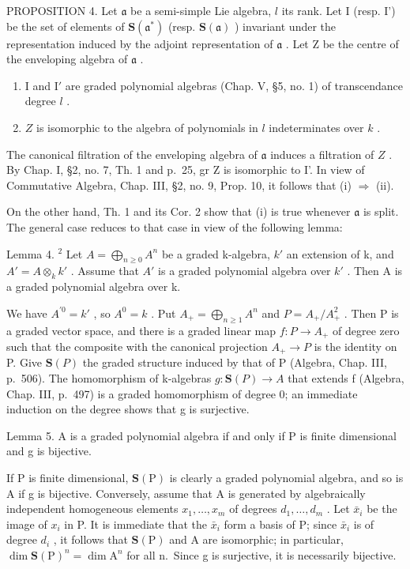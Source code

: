 PROPOSITION 4. Let \(\mathfrak{a}\) be a semi-simple Lie algebra, \(l\) its rank. Let I (resp. I') be the set of elements of \(\mathbf{S}(\mathfrak{a}^{*})\) (resp. \(\mathbf{S}(\mathfrak{a})\) ) invariant under the representation induced by the adjoint representation of \(\mathfrak{a}\) . Let Z be the centre of the enveloping algebra of \(\mathfrak{a}\) .

\begin{enumerate}
\def\labelenumi{(\roman{enumi})}
\item
  I and \(\mathrm{I}'\) are graded polynomial algebras (Chap. V, §5, no. 1) of transcendance degree \(l\) .
\item
  \(Z\) is isomorphic to the algebra of polynomials in \(l\) indeterminates over \(k\) .
\end{enumerate}

The canonical filtration of the enveloping algebra of \(\mathfrak{a}\) induces a filtration of \(Z\) . By Chap. I, §2, no. 7, Th. 1 and p.~25, gr Z is isomorphic to I'. In view of Commutative Algebra, Chap. III, §2, no. 9, Prop. 10, it follows that (i) \(\Longrightarrow\) (ii).

On the other hand, Th. 1 and its Cor. 2 show that (i) is true whenever \(\mathfrak{a}\) is split. The general case reduces to that case in view of the following lemma:

Lemma 4. \(^{2}\) Let \(A = \bigoplus_{n \geq 0} A^{n}\) be a graded k-algebra, \(k'\) an extension of k, and \(A' = A \otimes_{k} k'\) . Assume that \(A'\) is a graded polynomial algebra over \(k'\) . Then A is a graded polynomial algebra over k.

We have \(A^{\prime0}=k'\) , so \(A^{0}=k\) . Put \(A_{+}=\bigoplus_{n\geq1}A^{n}\) and \(P=A_{+}/A_{+}^{2}\) . Then P is a graded vector space, and there is a graded linear map \(f:P\to A_{+}\) of degree zero such that the composite with the canonical projection \(A_{+} \rightarrow P\) is the identity on P. Give \(\mathbf{S}(P)\) the graded structure induced by that of P (Algebra, Chap. III, p.~506). The homomorphism of k-algebras \(g : \mathbf{S}(P) \rightarrow A\) that extends f (Algebra, Chap. III, p.~497) is a graded homomorphism of degree 0; an immediate induction on the degree shows that g is surjective.

Lemma 5. A is a graded polynomial algebra if and only if P is finite dimensional and g is bijective.

If P is finite dimensional, \(\mathbf{S}(\mathrm{P})\) is clearly a graded polynomial algebra, and so is A if g is bijective. Conversely, assume that A is generated by algebraically independent homogeneous elements \(x_{1},\ldots,x_{m}\) of degrees \(d_{1},\ldots,d_{m}\) . Let \(\bar{x}_{i}\) be the image of \(x_{i}\) in P. It is immediate that the \(\bar{x}_{i}\) form a basis of P; since \(\bar{x}_{i}\) is of degree \(d_{i}\) , it follows that \(\mathbf{S}(\mathrm{P})\) and A are isomorphic; in particular, \(\dim\mathbf{S}(\mathrm{P})^{n}=\dim\mathrm{A}^{n}\) for all n.~Since g is surjective, it is necessarily bijective.

